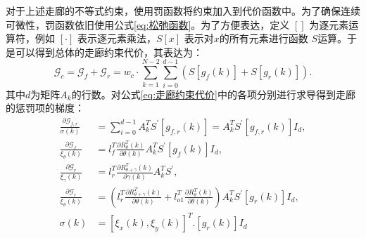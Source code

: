 \documentclass[master,academic]{ysuthesis} %
\begin{document}
		对于上述走廊的不等式约束，使用罚函数将约束加入到代价函数中。为了确保连续可微性，罚函数依旧使用公式\ref{eq:松弛函数}。为了方便表达，定义 \([]\) 为逐元素运算符，例如 \([\cdot]\) 表示逐元素乘法，\(S[x]\) 表示对$x$的所有元素进行函数 \(S\)运算。于是可以得到总体的走廊约束代价，其表达为：
		\begin{equation}
			\mathcal{G}_c =\mathcal{G}_{f}+\mathcal{G}_{r}=w_{c}\cdot \sum_{k=1}^{N-2}\sum_{i=0}^{d-1}(S[g_f(k)] + S[g_r(k)]).\label{eq:走廊约束代价}
		\end{equation}
		其中$d$为矩阵$A_k$的行数。对公式\ref{eq:走廊约束代价}中的各项分别进行求导得到走廊的惩罚项的梯度：
		\begin{equation}
			\begin{aligned}
				\frac{\partial \mathcal{G}_{f,r}}{\sigma \left( k \right)}&=\sum_{i=0}^{d-1}{A}_{k}^{T}S^{'}\left[ g_{f,r}\left( k \right) \right] =A_{k}^{T}S^{'}\left[ g_{f,r}\left( k \right) \right] I_d,\\
				\frac{\partial \mathcal{G}_f}{\xi _{\theta}\left( k \right)}&=l_{f}^{T}\frac{\partial R_{\theta}^{T}\left( k \right)}{\partial \theta \left( k \right)}A_{k}^{T}S^{'}\left[ g_f\left( k \right) \right] I_d,\\
				\frac{\partial \mathcal{G}_r}{\xi _{\gamma}\left( k \right)}&=l_{r}^{T}\frac{\partial R_{\theta +\gamma}^{T}\left( k \right)}{\partial \gamma \left( k \right)}A_{k}^{T}S^{'},\\
				\frac{\partial \mathcal{G}_r}{\xi _{\theta}\left( k \right)}&=\left( l_{r}^{T}\frac{\partial R_{\theta +\gamma}^{T}\left( k \right)}{\partial \theta \left( k \right)}+l_{o1}^{T}\frac{\partial R_{\theta}^{T}\left( k \right)}{\partial \theta \left( k \right)} \right) A_{k}^{T}S^{'}\left[ g_r\left( k \right) \right] I_d,\\
				\sigma \left( k \right) &=\left[ \xi _x\left( k \right) ,\xi _y\left( k \right) \right] ^T.\left[ g_r\left( k \right) \right] I_d
			\end{aligned}
		\end{equation}
		
\end{document}
